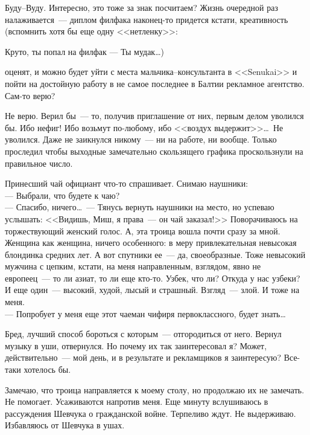 Буду--Вуду. Интересно, это тоже за знак посчитаем? Жизнь очередной раз 
налаживается~--- диплом филфака наконец-то придется кстати, креативность 
(вспомнить хотя бы еще одну <<нетленку>>:

Круто, ты попал на филфак --- Ты мудак\ldots)

\noindent оценят, и можно будет уйти с места мальчика--консультанта в <<Senukai>> и пойти 
на достойную работу в не самое последнее в Балтии рекламное агентство. Сам-то верю?

Не верю. Верил бы~--- то, получив приглашение от них, первым делом уволился бы. 
Ибо нефиг! Ибо возьмут по-любому, ибо <<воздух выдержит>>\ldots\ Не уволился. 
Даже не заикнулся никому~--- ни на работе, ни вообще. Только проследил чтобы выходные 
замечательно скользящего графика проскользнули на правильное число.

Принесший чай официант что-то спрашивает. Снимаю наушники:\\
--- Выбрали, что будете к чаю?\\
--- Спасибо, ничего\ldots~--- Тянусь вернуть наушники на место, но успеваю 
услышать: 
<<Видишь, Миш, я права~--- он чай заказал!>> Поворачиваюсь на торжествующий 
женский 
голос. А, эта троица вошла почти сразу за мной. Женщина как женщина, ничего 
особенного: в меру привлекательная невысокая блондинка средних лет. А вот 
спутники ее~--- да, своеобразные. Тоже невысокий мужчина с цепким, кстати, на 
меня 
направленным, взглядом, явно не европеец~--- то ли азиат, то ли еще кто-то. 
Узбек, 
что ли? Откуда у нас узбеки? И еще один~--- высокий, худой, лысый и страшный. 
Взгляд~--- злой. И тоже на меня. \\
--- Попробует у меня еще этот чаеман чифиря первоклассного, будет знать\ldots

Бред, лучший способ бороться с которым~--- отгородиться от него. Вернул музыку 
в уши, отвернулся. Но почему их так заинтересовал я? Может, действительно~--- мой 
день, и в результате и рекламщиков я заинтересую? Все-таки хотелось бы.

Замечаю, что троица направляется к моему столу, но продолжаю их не замечать. Не 
помогает. Усаживаются напротив меня. Еще минуту вслушиваюсь в рассуждения 
Шевчука о гражданской войне. Терпеливо ждут. Не выдерживаю. Избавляюсь от 
Шевчука в ушах.

